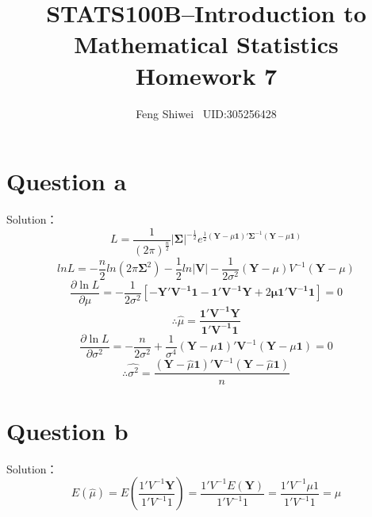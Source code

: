 \documentclass[a4papers]{ctexart}
\title{STATS100B--Introduction to Mathematical Statistics \\Homework 7}
\author{Feng Shiwei \ UID:305256428}
\date{}
\begin{document}
\maketitle
\section*{Question a}
\noindent Solution：\\
\indent 
\[L=\dfrac{1}{(2\pi)^{\frac{n}{2}}}|\boldsymbol{\Sigma}|^{-\frac{1}{2}} 
    e^{\frac{1}{2}(\boldsymbol{\boldsymbol{\boldsymbol{Y}}}-\mu\boldsymbol{1})'\boldsymbol{\Sigma}^{-1}(\boldsymbol{\boldsymbol{Y}}-\mu\boldsymbol{1}) }
\]
\[lnL = -\dfrac{n}{2}ln(2\pi\boldsymbol{\Sigma}^2)-\dfrac{1}{2}ln|\boldsymbol{V}|-\dfrac{1}{2\sigma^2}(\boldsymbol{Y}-\mu)V^{-1}(\boldsymbol{Y}-\mu)
 \]
 \[\dfrac {\partial \ln L}{\partial \mu }=-\dfrac {1}{2\sigma ^{2}}\left[ -\boldsymbol{Y'V^{-1}1}-\boldsymbol{1'V^{-1}Y}+2\boldsymbol{\mu 1'V^{-1}1}\right] =0
     \]
\[ \therefore \hat{\mu} = \boldsymbol{ \dfrac{1'V^{-1}Y}{1'V^{-1}1} }\]
\[ \dfrac {\partial \ln L}{\partial \sigma ^{2}}=-\dfrac {n}{2\sigma ^{2}}+\dfrac {1}{\sigma ^{4}}\left( \boldsymbol{Y}-\mu \boldsymbol{1}\right)'\boldsymbol{V}^{-1}\left( \boldsymbol{Y}-\mu \boldsymbol{1}\right) =0\]
\[\therefore \hat{\sigma^2} =\dfrac{\left( \boldsymbol{Y}-\hat{\mu} \boldsymbol{1}\right) '\boldsymbol{V}^{-1}\left( \boldsymbol{Y}-\hat{\mu} \boldsymbol{1}\right)}{n} \]


\section*{Question b}
\noindent  Solution：
\[E(\hat{\mu}) = E\left(\dfrac{1'V^{-1}\boldsymbol{Y}}{1'V^{-1}1}\right) = \dfrac{1'V^{-1}E(\boldsymbol{Y})}{1'V^{-1}1} =\dfrac{1'V^{-1}\mu1}{1'V^{-1}1} =\mu\]
\[  \]
\end{document}
